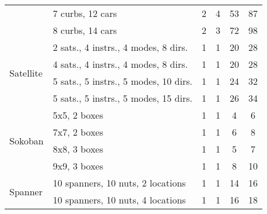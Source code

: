 \documentclass{article}
\begin{document}
\begin{table}[bt!]
{\begin{tabular}{ll|cc|cc}
                                & 7 curbs, 12 cars                  & 2                       & 4                        & 53                      & 87                       \\
                                & 8 curbs, 14 cars                  & 2                       & 3                        & 72                      & 98                       \\ \midrule
\multirow{4}{*}{Satellite}     & 2 sats., 4 instrs., 4 modes, 8 dirs.                      & 1                       & 1                        & 20                       & 28                        \\
                                & 4 sats., 4 instrs., 4 modes, 8 dirs.                        & 1                       & 1                        & 20                       & 28                        \\
                                & 5 sats., 5 instrs., 5 modes, 10 dirs.                        & 1                       & 1                        & 24                       & 32                        \\
                                & 5 sats., 5 instrs., 5 modes, 15 dirs.                      & 1                       & 1                        & 26                       & 34                       \\ \midrule
\multirow{4}{*}{Sokoban}     & 5x5, 2 boxes                      & 1                       & 1                        & 4                       & 6                        \\
                                & 7x7, 2 boxes                      & 1                       & 1                        & 6                       & 8                        \\
                                & 8x8, 3 boxes                      & 1                       & 1                        & 5                       & 7                        \\
                                & 9x9, 3 boxes                      & 1                       & 1                        & 8                       & 10                       \\ \midrule
\multirow{9}{*}{Spanner}     & 10 spanners, 10 nuts, 2 locations & 1                       & 1                        & 14                      & 16                       \\
                                & 10 spanners, 10 nuts, 4 locations & 1                       & 1                        & 16                      & 18                       \\

\end{tabular}}
\end{table}
\end{document}
